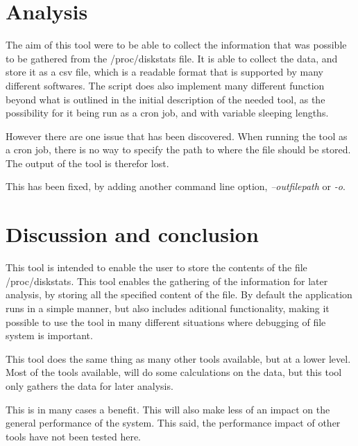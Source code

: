 \section{Analysis}
The aim of this tool were to be able to collect the information that was
possible to be gathered from the /proc/diskstats file. It is able to collect
the data, and store it as a csv file, which is a readable format that is
supported by many different softwares.
The script does also implement many different function beyond what is outlined
in the initial description of the needed tool, as the possibility for it being
run as a cron job, and with variable sleeping lengths.

However there are one issue that has been discovered. When running the tool as
a cron job, there is no way to specify the path to where the file should be
stored. The output of the tool is therefor lost.

This has been fixed, by adding another command line option,
\textit{--outfilepath} or \textit{-o}.

\section{Discussion and conclusion}
This tool is intended to enable the user to store the contents of the file
/proc/diskstats. This tool enables the gathering of the information for later
analysis, by storing all the specified content of the file.
By default the application runs in a simple manner, but also includes aditional
functionality, making it possible to use the tool in many different situations
where debugging of file system is important.

This tool does the same thing as many other tools available, but at a lower
level. Most of the tools available, will do some calculations on the data, but
this tool only gathers the data for later analysis.

This is in many cases a benefit. This will also make less of an impact on the
general performance of the system. This said, the performance impact of other
tools have not been tested here.


